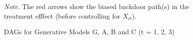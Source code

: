 \documentclass[
  11pt,
  a4paper,
]{article}
\begin{document}
\begin{figure}[H]

\caption{\label{fig-DAGs}DAGs for Generative Models G, A, B and C (t =
1, 2, 3)}

\begin{minipage}{0.50\linewidth}



\end{minipage}%
%
\begin{minipage}{0.50\linewidth}



\end{minipage}%
\newline
\begin{minipage}{0.50\linewidth}
\emph{Note.} The red arrows show the biased backdoor path(s) in the
treatment efffect (before controlling for \(X_{it}\)).\end{minipage}%

\end{figure}%
\end{document}
